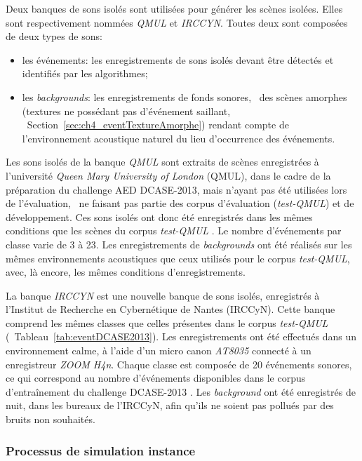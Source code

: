 Deux banques de sons isolés sont utilisées pour générer les scènes isolées. Elles sont respectivement nommées \emph{QMUL} et \emph{IRCCYN}. Toutes deux sont composées de deux types de sons:

\begin{itemize}
\item les événements: les enregistrements de sons isolés devant être détectés et identifiés par les algorithmes;
\item les \emph{backgrounds}: les enregistrements de fonds sonores, \ie~des scènes amorphes (textures ne possédant pas d'événement saillant, \cf~Section~\ref{sec:ch4_eventTextureAmorphe}) rendant compte de l’environnement acoustique naturel du lieu d'occurrence des événements. 
\end{itemize}

Les sons isolés de la banque \emph{QMUL} sont extraits de scènes enregistrées à l'université \emph{Queen Mary University of London} (QMUL), dans le cadre de la préparation du challenge AED DCASE-2013, mais n'ayant pas été utilisées lors de l'évaluation, \ie~ne faisant pas partie des corpus d'évaluation (\emph{test-QMUL}) et de développement. Ces sons isolés ont donc été enregistrés dans les mêmes conditions que les scènes du corpus \emph{test-QMUL} \citep{Giannoulis2013database}. Le nombre d'événements par classe varie de 3 à 23. Les enregistrements de \emph{backgrounds} ont été réalisés sur les mêmes environnements acoustiques que ceux utilisés pour le corpus \emph{test-QMUL}, avec, là encore, les mêmes conditions d'enregistrements.

La banque \emph{IRCCYN} est une nouvelle banque de sons isolés, enregistrés à l'Institut de Recherche en Cybernétique de Nantes (IRCCyN). Cette banque comprend les mêmes classes que celles présentes dans le corpus \emph{test-QMUL} (\cf~Tableau~\ref{tab:eventDCASE2013}). Les enregistrements ont été effectués dans un environnement calme, à l'aide d'un micro canon \emph{AT8035} connecté à un enregistreur \emph{ZOOM H4n}. Chaque classe est composée de 20 événements sonores, ce qui correspond au nombre d'événements disponibles dans le corpus d'entraînement du challenge DCASE-2013 \citep{Giannoulis2013database,giannoulis2013detection}. Les \emph{background} ont été enregistrés de nuit, dans les bureaux de l'IRCCyN, afin qu'ils ne soient pas pollués par des bruits non souhaités. 


\subsubsection{Processus de simulation instance}
\label{sec:ch7_simuProcessInstance}

